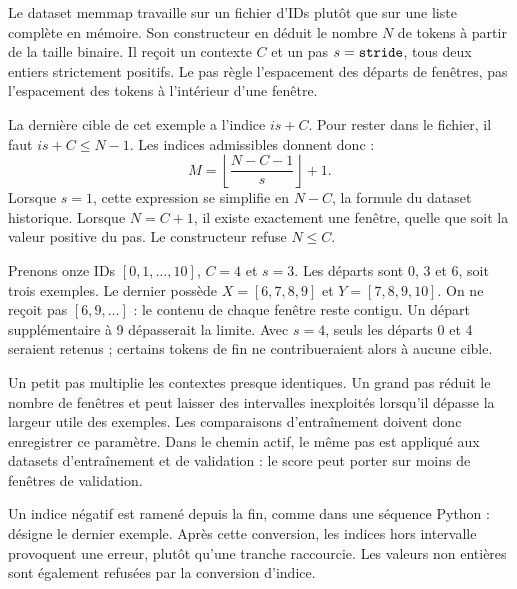 Le dataset memmap travaille sur un fichier d'IDs plutôt que sur une liste
complète en mémoire. Son constructeur en déduit le nombre \(N\) de tokens
à partir de la taille binaire. Il reçoit un contexte \(C\) et un pas
\(s=\text{\texttt{stride}}\), tous deux entiers strictement positifs.
Le pas règle l'espacement des départs de fenêtres, pas l'espacement
des tokens à l'intérieur d'une fenêtre.

La dernière cible de cet exemple a l'indice \(is+C\).
Pour rester dans le fichier, il faut \(is+C\leq N-1\).
Les indices admissibles donnent donc :
\[
    M=\left\lfloor\frac{N-C-1}{s}\right\rfloor+1.
\]
Lorsque \(s=1\), cette expression se simplifie en \(N-C\),
la formule du dataset historique. Lorsque \(N=C+1\),
il existe exactement une fenêtre, quelle que soit la valeur positive du pas.
Le constructeur refuse \(N\leq C\).

Prenons onze IDs \([0,1,\ldots,10]\), \(C=4\) et \(s=3\).
Les départs sont 0, 3 et 6, soit trois exemples.
Le dernier possède \(X=[6,7,8,9]\) et \(Y=[7,8,9,10]\).
On ne reçoit pas \([6,9,\ldots]\) : le contenu de chaque fenêtre
reste contigu. Un départ supplémentaire à 9 dépasserait la limite.
Avec \(s=4\), seuls les départs 0 et 4 seraient retenus ;
certains tokens de fin ne contribueraient alors à aucune cible.

Un petit pas multiplie les contextes presque identiques.
Un grand pas réduit le nombre de fenêtres et peut laisser des intervalles
inexploités lorsqu'il dépasse la largeur utile des exemples.
Les comparaisons d'entraînement doivent donc enregistrer ce paramètre.
Dans le chemin actif, le même pas est appliqué aux datasets d'entraînement
et de validation : le score peut porter sur moins de fenêtres de validation.

Un indice négatif est ramené depuis la fin, comme dans une séquence Python :
 désigne le dernier exemple.
Après cette conversion, les indices hors intervalle provoquent une erreur,
plutôt qu'une tranche raccourcie. Les valeurs non entières sont également
refusées par la conversion d'indice.



